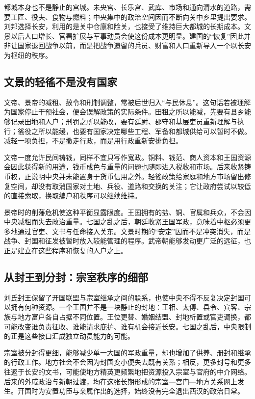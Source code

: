 都城本身也不是静止的宫城。未央宫、长乐宫、武库、市场和通向渭水的道路，需要工匠、役夫、食物与燃料；中央集中的政治空间因而不断向关中乡里提出要求。刘邦选择长安，利用的是关中仓廪和险关，也接受了维持巨大都城的长期成本。文景以后人口增长、官署扩展与军事动员会使这份成本更明显。建国的“恢复”因此并非让国家退回战争以前，而是把战争遗留的兵员、财富和人口重新导入一个以长安为枢纽的秩序。

\subsection{文景的轻徭不是没有国家}

文帝、景帝的减租、赦令和刑制调整，常被后世归入“与民休息”。这句话若被理解为国家停止干预社会，便会误解政策的实际条件。田租之所以能减，先要有县乡能够记录田地和人户；刑罚之所以能改，要有廷尉、郡守和基层吏员重新理解与执行；徭役之所以能缓，也要有国家决定哪些工程、军备和都城供给可以暂时不做。减轻一项负担，不是撤走行政，而是用行政重新安排负担。

文帝一度允许民间铸钱，同样不宜只写作宽政。铜料、钱范、商人资本和王国资源会因此获得新的用途，钱币成色与重量的问题也随即进入税收和市场。后来收紧铸币权，正说明中央并未能置身于货币信用之外。轻徭政策给家庭和地方市场留出修复空间，却没有取消国家对土地、兵役、道路和交换的关注；它让政府尝试以较低的直接索取，换取编户和秩序可以继续维持。

景帝时的削藩危机使这种平衡显露限度。王国拥有的盐、铜、官属和兵众，不会因中央减租而失去政治重量。七国之乱之后，朝廷收紧王国军政，意味着中枢必须更多地通过官吏、文书与任命接入关东。文景时期的“安定”因而不是冲突消失，而是战争、封国和征发被暂时放入较能管理的程序。武帝朝能够发动更广泛的远征，也正是建立在这些程序和恢复的人户之上。

\subsection{从封王到分封：宗室秩序的细部}

刘氏封王保留了开国联盟与宗室继承之间的联系，也使中央不得不反复决定封国可以拥有何种资源。一个王国并不是一块静止的封地：王相、太傅、县令、宾客、宗族与地方富户各自占据不同位置。王位更替、婚姻结盟、封地析置或官吏调换，都可能改变谁负责征收、谁能请求庇护、谁有机会接近长安。七国之乱后，中央限制的正是这些接口汇成独立动员能力的可能。

宗室被分封得更细，能够减少单一大国的军政重量，却也增加了供养、册封和继承的行政工作。地方社会不会因为封国变小便失去既有关系；相反，更多封号和更多往返于长安的文书，可能使地方精英更频繁地把资源投入宗室与官府的中介网络。后来的外戚政治与新朝过渡，均在这张长期形成的宗室—宫门—地方关系网上发生。开国时为安置功臣与亲属作出的选择，始终没有完全退出西汉的政治日常。

